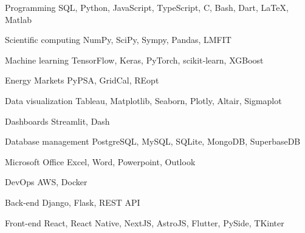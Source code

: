 
\begin{cvskills}

  \cvskill
  {Programming} %
  {SQL, Python, JavaScript, TypeScript, C, Bash, Dart, LaTeX, Matlab} %

  \cvskill
  {Scientific computing} %
  {NumPy, SciPy, Sympy, Pandas, LMFIT} %

  \cvskill
  {Machine learning} %
  {TensorFlow, Keras, PyTorch, scikit‑learn, XGBoost} %

  \cvskill
  {Energy Markets} %
  {PyPSA, GridCal, REopt} %

  \cvskill
  {Data visualization} %
  {Tableau, Matplotlib, Seaborn, Plotly, Altair, Sigmaplot} %

  \cvskill
  {Dashboards} %
  {Streamlit, Dash} %

  \cvskill
  {Database management} %
  {PostgreSQL, MySQL, SQLite, MongoDB, SuperbaseDB} %

  \cvskill
  {Microsoft Office} %
  {Excel, Word, Powerpoint, Outlook} %

  \cvskill
  {DevOps} %
  {AWS, Docker} %

  \cvskill
  {Back-end} %
  {Django, Flask, REST API} %

  \cvskill
  {Front-end} %
  {React, React Native, NextJS, AstroJS, Flutter, PySide, TKinter} %


\end{cvskills}

